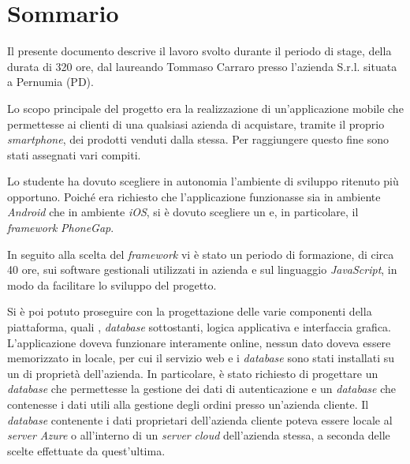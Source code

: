 
\cleardoublepage
{}
{}
\begingroup
\let\clearpage\relax
\let\cleardoublepage\relax
\let\cleardoublepage\relax

\chapter*{Sommario}

Il presente documento descrive il lavoro svolto durante il periodo di stage, della durata di 320 ore, dal laureando Tommaso Carraro presso l'azienda \visione{} S.r.l. situata a Pernumia (PD).

Lo scopo principale del progetto era la realizzazione di un'applicazione mobile che permettesse ai clienti di una qualsiasi azienda di acquistare, tramite il proprio \textit{smartphone}, dei prodotti venduti dalla stessa. Per raggiungere questo fine sono stati assegnati vari compiti.

Lo studente ha dovuto scegliere in autonomia l'ambiente di sviluppo ritenuto più opportuno. Poiché era richiesto che l'applicazione funzionasse sia in ambiente \textit{Android} che in ambiente \textit{iOS}, si è dovuto scegliere un  e, in particolare, il \textit{framework} \textit{PhoneGap}.

In seguito alla scelta del \textit{framework} vi è stato un periodo di formazione, di circa 40 ore, sui software gestionali utilizzati in azienda e sul linguaggio \textit{JavaScript}, in modo da facilitare lo sviluppo del progetto.

Si è poi potuto proseguire con la progettazione delle varie componenti della piattaforma, quali , \textit{database} sottostanti, logica applicativa e interfaccia grafica. 
L'applicazione doveva funzionare interamente online, nessun dato doveva essere memorizzato in locale, per cui il servizio web e i \textit{database} sono stati installati su un  di proprietà dell'azienda.
In particolare, è stato richiesto di progettare un \textit{database} che permettesse la gestione dei dati di autenticazione e un \textit{database} che contenesse i dati utili alla gestione degli ordini presso un'azienda cliente. Il \textit{database} contenente i dati proprietari dell'azienda cliente poteva essere locale al \textit{server Azure} o all'interno di un \textit{server} \textit{cloud} dell'azienda stessa, a seconda delle scelte effettuate da quest'ultima.

